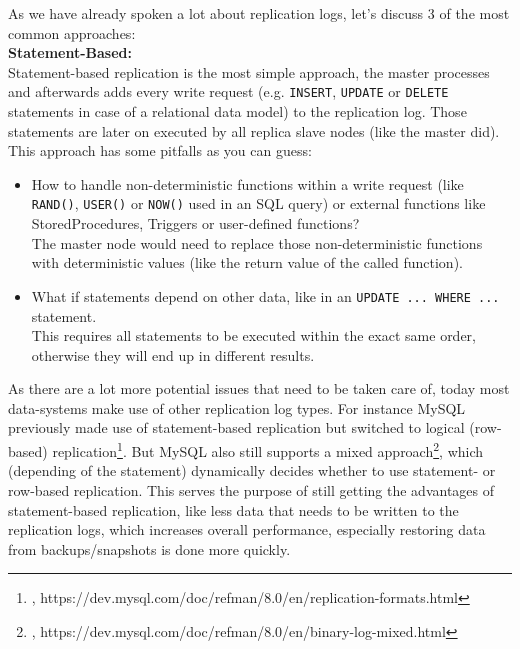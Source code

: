{
As we have already spoken a lot about replication logs, let's discuss 3 of the most common approaches:\\

\textbf{Statement-Based:}\\
Statement-based replication is the most simple approach, the master processes and afterwards adds every write request (e.g. \lstinline{INSERT}, \lstinline{UPDATE} or \lstinline{DELETE} statements in case of a relational data model) to the replication log. Those statements are later on executed by all replica slave nodes (like the master did). This approach has some pitfalls as you can guess:\\
\begin{itemize}
\item How to handle non-deterministic functions within a write request (like \lstinline{RAND()}, \lstinline{USER()} or \lstinline{NOW()} used in an SQL query) or external functions like StoredProcedures, Triggers or user-defined functions?\\
The master node would need to replace those non-deterministic functions with deterministic values (like the return value of the called function).
\item What if statements depend on other data, like in an \lstinline{UPDATE ... WHERE ...} statement. \\
This requires all statements to be executed within the exact same order, otherwise they will end up in different results.\\
\end{itemize}
As there are a lot more potential issues that need to be taken care of, today most data-systems make use of other replication log types. For instance MySQL previously made use of statement-based replication but switched to logical (row-based) replication\footnote{\cite{MYSQLRF}, https://dev.mysql.com/doc/refman/8.0/en/replication-formats.html}. But MySQL also still supports a mixed approach\footnote{\cite{MYSQLMR}, https://dev.mysql.com/doc/refman/8.0/en/binary-log-mixed.html}, which (depending of the statement) dynamically decides whether to use statement- or row-based replication. This serves the purpose of still getting the advantages of statement-based replication, like less data that needs to be written to the replication logs, which increases overall performance, especially restoring data from backups/snapshots is done more quickly.\\

}
